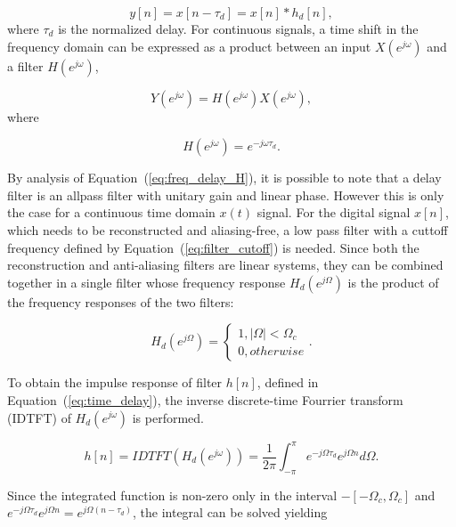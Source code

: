 \begin{equation}
  y[n] = x[n-\tau_d] = x[n] * h_d[n],
  \label{eq:time_delay}
\end{equation}
where $\tau_d$ is the normalized delay. For continuous signals, a time shift in
the frequency domain can be expressed as a product between an input
$X(e^{j\omega})$ and a filter $H(e^{j\omega})$,

\begin{equation}
  Y(e^{j\omega}) = H(e^{j\omega}) X(e^{j\omega}),
  \label{eq:freq_delay}
\end{equation}
where

\begin{equation}
  H(e^{j\omega}) = e^{-j\omega \tau_d}.
  \label{eq:freq_delay_H}
\end{equation}

By analysis of Equation~(\ref{eq:freq_delay_H}), it is possible to note that
a delay filter is an allpass filter with unitary gain and linear phase. However
this is only the case for a continuous time domain $x(t)$ signal. For the
digital signal $x[n]$, which needs to be reconstructed and aliasing-free, a low
pass filter with a cuttoff frequency defined by Equation~(\ref{eq:filter_cutoff})
is needed. Since both the reconstruction and
anti-aliasing filters are linear systems, they can be combined together in a
single filter whose frequency response $H_d(e^{j\Omega})$ is the product of the
frequency responses of the two filters:

\begin{equation}
  H_d(e^{j\Omega}) =   
  \begin{cases}
    1, |\Omega| < \Omega_c \\
    0, otherwise
  \end{cases}
  \label{eq:fdfilter_H}
  .
\end{equation}

To obtain the impulse response of filter $h[n]$, defined in Equation~(\ref{eq:time_delay}),
the inverse discrete-time Fourrier transform (IDTFT) of $H_d(e^{j\omega})$ is
performed.

\begin{equation}
  h[n] = IDTFT(H_d(e^{j\omega})) = \frac{1}{2\pi}\int_{-\pi}^{\pi}e^{-j\Omega\tau_{d}} e^{j\Omega n} d\Omega .
  \label{eq:idtft_h}
\end{equation}

Since the integrated function is non-zero only in the interval $-[-\Omega_c,\Omega_c]$
and $e^{-j\Omega\tau_{d}} e^{j\Omega n} = e^{j\Omega  (n-\tau_{d})}$, the integral can be solved yielding

